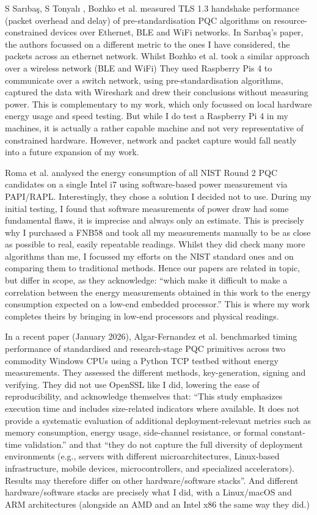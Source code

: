 \documentclass[11pt, letterpaper]{article}
\begin{document}
S Sarıbaş, S Tonyalı \cite{saribacs2022performance}, Bozhko et al. \cite{bozhko2023performance} measured TLS 1.3 handshake performance (packet overhead and delay) of pre-standardisation PQC algorithms on resource-constrained devices over Ethernet, BLE and WiFi networks. In Sarıbaş’s paper, the authors focussed on a different metric to the ones I have considered, the packets across an ethernet network. Whilst Bozhko et al. took a similar approach over a wireless network (BLE and WiFi) They used Raspberry Pis 4 to communicate over a switch network, using pre-standardisation algorithms, captured the data with Wireshark and drew their conclusions without measuring power. This is complementary to my work, which only focussed on local hardware energy usage and speed testing. But while I do test a Raspberry Pi 4 in my machines, it is actually a rather capable machine and not very representative of constrained hardware. However, network and packet capture would fall neatly into a future expansion of my work.

Roma et al. \cite{roma2021energy} analysed the energy consumption of all NIST Round 2 PQC candidates on a single Intel i7 using software-based power measurement via PAPI/RAPL. Interestingly, they chose a solution I decided not to use. During my initial testing, I found that software measurements of power draw had some fundamental flaws, it is imprecise and always only an estimate. This is precisely why I purchased a FNB58 and took all my measurements manually to be as close as possible to real, easily repeatable readings.  Whilst they did check many more algorithms than me, I focussed my efforts on the NIST standard ones and on comparing them to traditional methods. Hence our papers are related in topic, but differ in scope, as they acknowledge: “which make it difficult to make a correlation between the energy measurements obtained in this work to the energy consumption expected on a low-end embedded processor.” This is where my work completes theirs by bringing in low-end processors and physical readings.

In a recent paper (January 2026), Algar-Fernandez et al. \cite{algar2026benchmarking} benchmarked timing performance of standardised and research-stage PQC primitives across two commodity Windows CPUs using a Python TCP testbed without energy measurements. They assessed the different methods, key-generation, signing and verifying. They did not use OpenSSL like I did, lowering the ease of reproducibility, and acknowledge themselves that: “This study emphasizes execution time and includes size-related indicators where available. It does not provide a systematic evaluation of additional deployment-relevant metrics such as memory consumption, energy usage, side-channel resistance, or formal constant-time validation.” and that “they do not capture the full diversity of deployment environments (e.g., servers with different microarchitectures, Linux-based infrastructure, mobile devices, microcontrollers, and specialized accelerators). Results may therefore differ on other hardware/software stacks”. And different hardware/software stacks are precisely what I did, with a Linux/macOS and ARM architectures (alongside an AMD and an Intel x86 the same way they did.)
\end{document}

